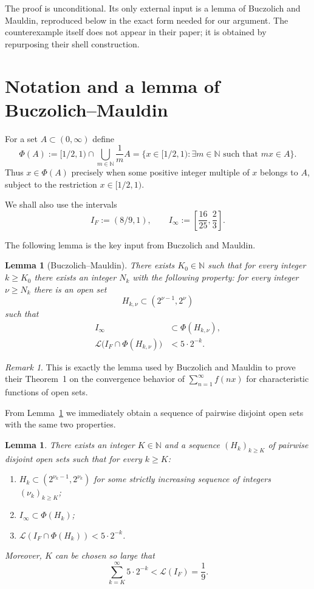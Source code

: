 \documentclass[11pt]{article}
\newtheorem{lemma}[theorem]{Lemma}
\theoremstyle{remark}
\newtheorem{remark}[theorem]{Remark}
\newcommand{\N}{\mathbb{N}}
\newcommand{\Leb}{\mathcal{L}}
\begin{document}
The proof is unconditional. Its only external input is a lemma of Buczolich and Mauldin, reproduced below in the exact form needed for our argument. The counterexample itself does not appear in their paper; it is obtained by repurposing their shell construction.

\section{Notation and a lemma of Buczolich--Mauldin}

For a set $A\subset (0,\infty)$ define
\[
  \Phi(A):=[1/2,1)\cap \bigcup_{m\in \N}\frac1m A
  =\bigl\{x\in [1/2,1): \exists m\in \N\text{ such that }mx\in A\bigr\}.
\]
Thus $x\in \Phi(A)$ precisely when some positive integer multiple of $x$ belongs to $A$, subject to the restriction $x\in [1/2,1)$.

We shall also use the intervals
\[
  I_F:=(8/9,1),\qquad I_\infty:=\left[\frac{16}{25},\frac23\right].
\]

The following lemma is the key input from Buczolich and Mauldin.

\begin{lemma}[Buczolich--Mauldin]\label{lem:BM}
  There exists $K_0\in \N$ such that for every integer $k\ge K_0$ there exists an integer $N_k$ with the following property: for every integer $\nu\ge N_k$ there is an open set
  \[
    H_{k,\nu}\subset (2^{\nu-1},2^\nu)
  \]
  such that
  \begin{align*}
    I_\infty &\subset \Phi(H_{k,\nu}),\\
    \Leb\bigl(I_F\cap \Phi(H_{k,\nu})\bigr)&<5\cdot 2^{-k}.
  \end{align*}
\end{lemma}

\begin{remark}
  This is exactly the lemma used by Buczolich and Mauldin to prove their Theorem~1 on the convergence behavior of $\sum_{n=1}^{\infty} f(nx)$ for characteristic functions of open sets.
\end{remark}

From Lemma~\ref{lem:BM} we immediately obtain a sequence of pairwise disjoint open sets with the same two properties.

\begin{lemma}\label{lem:disjoint-shells}
  There exists an integer $K\in \N$ and a sequence $(H_k)_{k\ge K}$ of pairwise disjoint open sets such that for every $k\ge K$:
  \begin{enumerate}
    \item $H_k\subset (2^{\nu_k-1},2^{\nu_k})$ for some strictly increasing sequence of integers $(\nu_k)_{k\ge K}$;
    \item $I_\infty\subset \Phi(H_k)$;
    \item $\Leb(I_F\cap \Phi(H_k))<5\cdot 2^{-k}$.
  \end{enumerate}
  Moreover, $K$ can be chosen so large that
  \begin{equation}\label{eq:tail-small}
    \sum_{k=K}^{\infty} 5\cdot 2^{-k}<\Leb(I_F)=\frac19.
  \end{equation}
\end{lemma}
\end{document}
